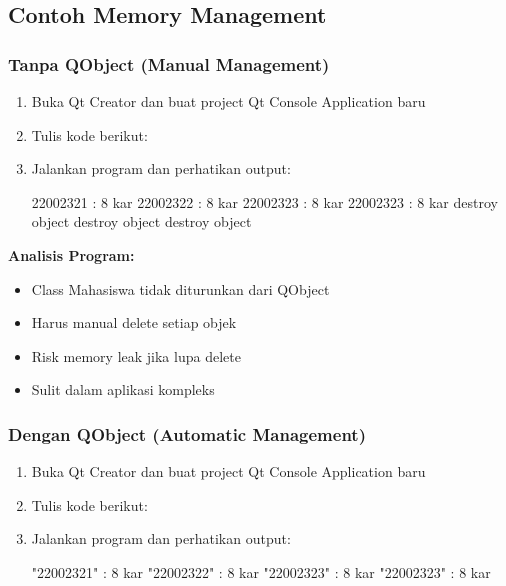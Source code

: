 \subsection{Contoh Memory Management}

\subsubsection{Tanpa QObject (Manual Management)}

\begin{enumerate}
\item Buka Qt Creator dan buat project Qt Console Application baru
\item Tulis kode berikut:



\item Jalankan program dan perhatikan output:

\begin{lcverbatim}
22002321 : 8 kar
22002322 : 8 kar
22002323 : 8 kar
22002323 : 8 kar
destroy object
destroy object
destroy object
\end{lcverbatim}
\end{enumerate}

\textbf{Analisis Program:}
\begin{itemize}
\item Class Mahasiswa tidak diturunkan dari QObject
\item Harus manual delete setiap objek
\item Risk memory leak jika lupa delete
\item Sulit dalam aplikasi kompleks
\end{itemize}

\subsubsection{Dengan QObject (Automatic Management)}

\begin{enumerate}
\item Buka Qt Creator dan buat project Qt Console Application baru
\item Tulis kode berikut:



\item Jalankan program dan perhatikan output:

\begin{lcverbatim}
"22002321" : 8 kar
"22002322" : 8 kar
"22002323" : 8 kar
"22002323" : 8 kar
\end{lcverbatim}
\end{enumerate}


